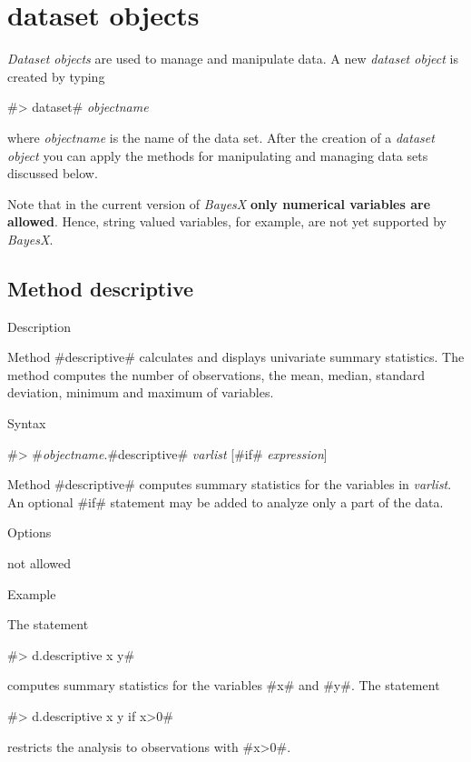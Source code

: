 \chapter{dataset objects} \label{chap_data}
\label{datasetobj}  


{\em Dataset objects} are used to manage and manipulate data. A new {\em dataset object} is created by typing

#> dataset# {\em objectname}

where {\em objectname} is the name of the data set. After the
creation of a {\em dataset object} you can apply the methods for
manipulating and managing data sets discussed below.

Note that in the current version of {\em BayesX} {\bf only
numerical variables are allowed}. Hence, string valued variables,
for example,  are not yet supported by {\em BayesX}.



\clearpage



\section{Method descriptive}
\label{descriptive} 
 

\begin{stanza}{Description}

{Method #descriptive# calculates and displays univariate summary
statistics. The method computes the number of observations, the
mean, median, standard deviation, minimum and maximum of
variables.}
\end{stanza}

\begin{stanza}{Syntax}

{#> #{\em objectname}.#descriptive# {\em varlist} [#if# {\em expression}]

Method #descriptive# computes summary statistics for the variables
in {\em varlist}. An optional #if# statement may be added to
analyze only a part of the data.}
\end{stanza}

\begin{stanza}{Options}

{not allowed}
\end{stanza}


\begin{stanza}{Example}

{The statement

#> d.descriptive x y#

computes summary statistics for the variables #x# and #y#.
The statement

#> d.descriptive x y if x>0#

restricts the analysis to observations with #x>0#.}
\end{stanza}

